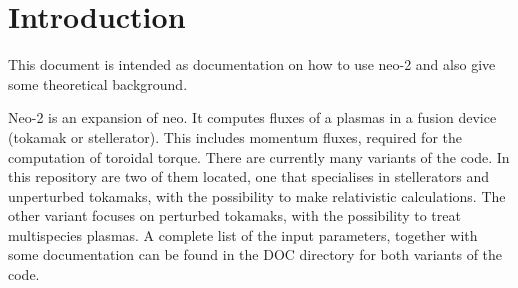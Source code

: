 \chapter{Introduction}
This document is intended as documentation on how to use neo-2 and also
give some theoretical background.

Neo-2 is an expansion of neo. It computes fluxes of a plasmas in a
fusion device (tokamak or stellerator). This includes momentum fluxes,
required for the computation of toroidal torque.
There are currently many variants of the code. In this repository are
two of them located,  one that specialises in stellerators and
unperturbed tokamaks, with the possibility to make relativistic
calculations.
The other variant focuses on perturbed tokamaks, with the possibility to
treat multispecies plasmas.
A complete list of the input parameters, together with some
documentation can be found in the DOC directory for both variants of the
code.
